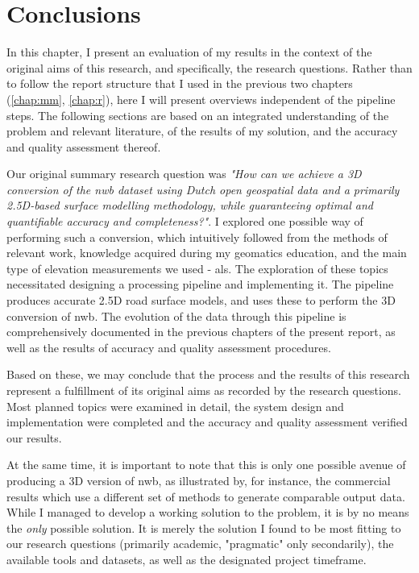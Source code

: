 
\chapter{Conclusions}
\label{chap:c}

In this chapter, I present an evaluation of my results in the context of the original aims of this research, and specifically, the research questions. Rather than to follow the report structure that I used in the previous two chapters (\ref{chap:mm}, \ref{chap:r}), here I will present overviews independent of the pipeline steps. The following sections are based on an integrated understanding of the problem and relevant literature, of the results of my solution, and the accuracy and quality assessment thereof.

Our original summary research question was \textit{"How can we achieve a 3D conversion of the \ac{nwb} dataset using Dutch open geospatial data and a primarily 2.5D-based surface modelling methodology, while guaranteeing optimal and quantifiable accuracy and completeness?"}. I explored one possible way of performing such a conversion, which intuitively followed from the methods of relevant work, knowledge acquired during my geomatics education, and the main type of elevation measurements we used - \ac{als}. The exploration of these topics necessitated designing a processing pipeline and implementing it. The pipeline produces accurate 2.5D road surface models, and uses these to perform the 3D conversion of \ac{nwb}. The evolution of the data through this pipeline is comprehensively documented in the previous chapters of the present report, as well as the results of accuracy and quality assessment procedures.

Based on these, we may conclude that the process and the results of this research represent a fulfillment of its original aims as recorded by the research questions. Most planned topics were examined in detail, the system design and implementation were completed and the accuracy and quality assessment verified our results.

At the same time, it is important to note that this is only one possible avenue of producing a 3D version of \ac{nwb}, as illustrated by, for instance, the commercial results which use a different set of methods to generate comparable output data. While I managed to develop a working solution to the problem, it is by no means the \textit{only} possible solution. It is merely the solution I found to be most fitting to our research questions (primarily academic, "pragmatic" only secondarily), the available tools and datasets, as well as the designated project timeframe.

